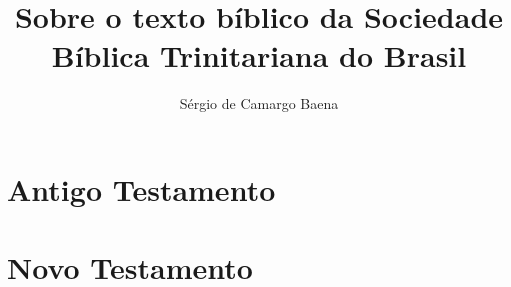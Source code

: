 \documentclass[a4paper]{scrbook}
\author{Sérgio de Camargo Baena}
\title{Sobre o texto bíblico da Sociedade Bíblica Trinitariana do Brasil}
\begin{document}
\maketitle
\tableofcontents

\part{Antigo Testamento}


\part{Novo Testamento}

\end{document}
